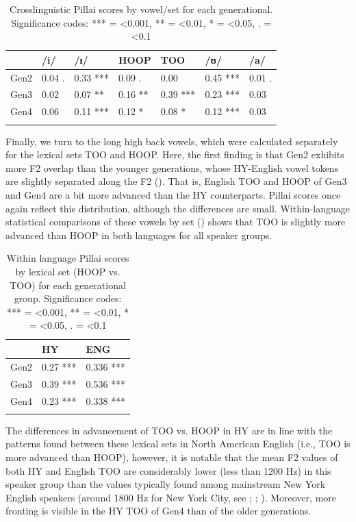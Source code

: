 \documentclass[output=paper]{langsci/langscibook}
\begin{document}
\begin{table}
\begin{tabularx}{\textwidth}{XXXXXXX} 
\lsptoprule
& /i/ & /ɪ/ &  HOOP &  TOO &  /ʊ/ &  /a/ \\
\hline
Gen2 & 0.04 . & 0.33 *** & 0.09 . & 0.00  & 0.45 *** & 0.01 .\\
Gen3 & 0.02 & 0.07 ** & 0.16 ** & 0.39 *** & 0.23 *** & 0.03  \\
Gen4 & 0.06  & 0.11 *** & 0.12 * & 0.08 * & 0.12 *** & 0.03  \\
\lspbottomrule
\end{tabularx}
\caption{Crosslinguistic Pillai scores by vowel/set for each generational. Significance codes: *** = <0.001, ** = <0.01, * = <0.05, . = <0.1}\label{tab:nove:4}
\end{table}

Finally, we turn to the long high back vowels, which were calculated separately for the lexical sets TOO and HOOP. Here, the first finding is that Gen2 exhibits more F2 overlap than the younger generations, whose HY-English vowel tokens are slightly separated along the F2 (). That is, English TOO and HOOP of Gen3 and Gen4 are a bit more advanced than the HY counterparts. Pillai scores once again reflect this distribution, although the differences are small. Within-language statistical comparisons of these vowels by set () shows that TOO is slightly more advanced than HOOP in both languages for all speaker groups.

\begin{table}
\begin{tabularx}{0.6\textwidth}{XXX}
\lsptoprule 
 & {HY} & {ENG} \\
\hline
Gen2 & 0.27 *** & 0.336 ***\\
Gen3 & 0.39 {***} & 0.536 {***}\\
Gen4 & 0.23 {***} & 0.338 {***}\\
\lspbottomrule
\end{tabularx}
\caption{Within language Pillai scores by lexical set (HOOP vs. TOO) for each generational group. Significance codes: *** = <0.001, ** = <0.01, * = <0.05, . = <0.1}
\label{tab:nove:5}
\end{table}

The differences in advancement of TOO vs. HOOP in HY are in line with the patterns found between these lexical sets in North American English (i.e., TOO is more advanced than HOOP), however, it is notable that the mean F2 values of both HY and English TOO are considerably lower (less than 1200 Hz) in this speaker group than the values typically found among mainstream New York English speakers (around 1800 Hz for New York City, see \citealt{Newman2014}; \citealt{Wong2014}; \citealt{HaddicanEtAl2019}). Moreover, more fronting is visible in the HY TOO of Gen4 than of the older generations.
\end{document}
